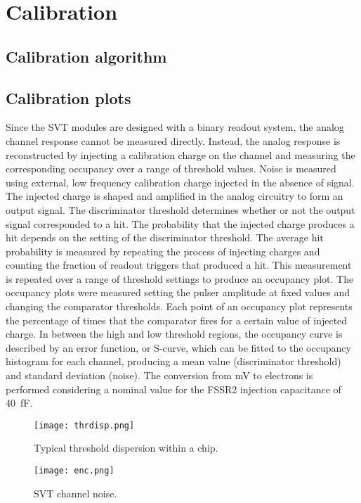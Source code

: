 \section{Calibration}

\subsection{Calibration algorithm}
\subsection{Calibration plots}

Since the SVT modules are designed with a binary readout system, the analog channel response cannot be measured directly. Instead, the analog response is reconstructed by injecting a calibration charge on the channel and measuring the corresponding occupancy over a range of threshold values. Noise is measured using external, low frequency calibration charge injected in the absence of signal. The injected charge is shaped and amplified in the analog circuitry to form an output signal. The discriminator threshold determines whether or not the output signal corresponded to a hit. The probability that the injected charge produces a hit depends on the setting of the discriminator threshold. The average hit probability is measured by repeating the process of injecting charges and counting the fraction of readout triggers that produced a hit. This measurement is repeated over a range of threshold settings to produce an occupancy plot. The occupancy plots were measured setting the pulser amplitude at fixed values and changing the comparator thresholds. Each point of an occupancy plot represents the percentage of times that the comparator fires for a certain value of injected charge. In between the high and low threshold regions, the occupancy curve is described by an error function, or S-curve, which can be fitted to the occupancy histogram for each channel, producing a mean value (discriminator threshold) and standard deviation (noise). The conversion from mV to electrons is performed considering a nominal value for the FSSR2 injection capacitance of 40~fF. 

\begin{figure}[hbt] 
\centering 
\texttt{[image: thrdisp.png]}
\caption{Typical threshold dispersion within a chip.}
\label{fig:thrdisp}
\end{figure}

\begin{wrapfigure}{l}{0.5\columnwidth}
\texttt{[image: enc.png]}
\caption{SVT channel noise.}
\label{fig:enc}
\end{wrapfigure}

